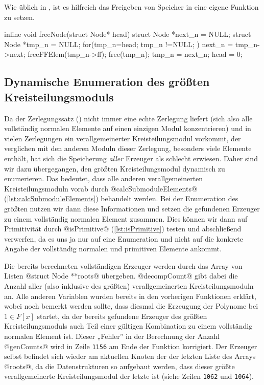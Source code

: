 Wie üblich in \Clang, ist es hilfreich das Freigeben von Speicher in eine 
eigene Funktion zu setzen.

\begin{ccode}[caption={Aus \url{../Sage/enumeratePCNs.c}},
  firstnumber=203, label=lst:freeNode]
inline void freeNode(struct Node* head){
    struct Node *next_n = NULL;
    struct Node *tmp_n = NULL;
    for(tmp_n=head; tmp_n !=NULL; ){
        next_n = tmp_n->next;
        freeFFElem(tmp_n->ff);
        free(tmp_n);
        tmp_n = next_n;
    }
    head = 0;
}
\end{ccode}

\subsection{Dynamische Enumeration des größten Kreisteilungsmoduls}

Da der Zerlegungssatz () nicht immer eine echte
Zerlegung liefert (sich also alle vollständig normalen Elemente auf einen
einzigen Modul konzentrieren) und in vielen Zerlegungen ein verallgemeinerter
Kreisteilungsmodul vorkommt, der verglichen mit den anderen Moduln dieser
Zerlegung, besonders viele Elemente enthält, hat sich die Speicherung
\emph{aller} Erzeuger als schlecht erwiesen. Daher sind wir dazu übergegangen,
den größten Kreisteilungsmodul dynamisch zu enumerieren. Das bedeutet, dass
alle anderen verallgemeinerten Kreisteilungsmoduln vorab durch 
@calcSubmoduleElements@ (\autoref{lst:calcSubmoduleElements}) behandelt werden.
Bei der Enumeration des größten nutzen wir dann diese Informationen und setzen
die gefundenen Erzeuger zu einem vollständig normalen Element zusammen. Dies
können wir dann auf Primitivität durch @isPrimitive@
(\autoref{lst:isPrimitive}) testen und abschließend verwerfen, da es uns ja nur
auf eine Enumeration und nicht auf die konkrete Angabe der vollständig normalen
und primitiven Elemente ankommt.

Die bereits berechneten vollständigen Erzeuger werden durch 
das Array von Listen @struct Node **roots@ übergeben. @decompCount@ gibt dabei
die Anzahl aller (also inklusive des größten) verallgemeinerten
Kreisteilungsmoduln an. Alle anderen Variablen wurden bereits in den vorherigen
Funktionen erklärt, wobei noch bemerkt werden sollte, dass diesmal die
Erzeugung der Polynome bei $1 \in F[x]$ startet, da der bereits gefundene
Erzeuger des größten Kreisteilungsmoduls auch Teil einer gültigen Kombination
zu einem vollständig normalen Element ist. Dieser „Fehler” in der Berechnung
der Anzahl @genCounts@ wird in Zeile \texttt{1156} am Ende der Funktion
korrigiert. Der Erzeuger selbst befindet sich wieder am aktuellen Knoten der
der letzten Liste des Arrays @roots@, da die Datenstrukturen so
aufgebaut werden, dass dieser größte verallgemeinerte Kreisteilungsmodul der
letzte ist (siehe Zeilen \texttt{1062} und \texttt{1064}).


